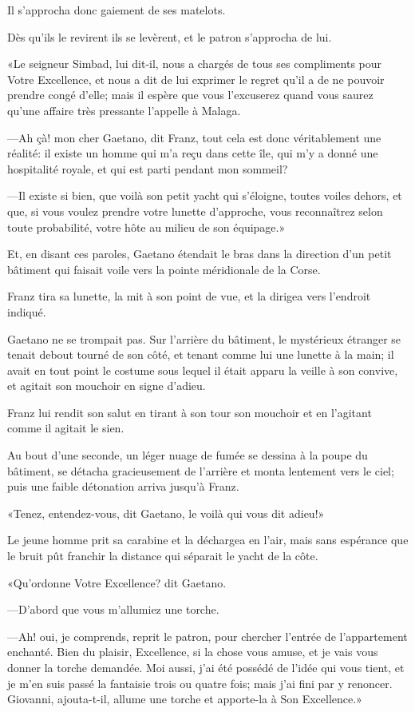 Il s'approcha donc gaiement de ses matelots. 

Dès qu'ils le revirent ils se levèrent, et le patron s'approcha de lui. 

«Le seigneur Simbad, lui dit-il, nous a chargés de tous ses compliments pour Votre Excellence, et nous a dit de lui exprimer le regret qu'il a de ne pouvoir prendre congé d'elle; mais il espère que vous l'excuserez quand vous saurez qu'une affaire très pressante l'appelle à Malaga. 

—Ah çà! mon cher Gaetano, dit Franz, tout cela est donc véritablement une réalité: il existe un homme qui m'a reçu dans cette île, qui m'y a donné une hospitalité royale, et qui est parti pendant mon sommeil? 

—Il existe si bien, que voilà son petit yacht qui s'éloigne, toutes voiles dehors, et que, si vous voulez prendre votre lunette d'approche, vous reconnaîtrez selon toute probabilité, votre hôte au milieu de son équipage.» 

Et, en disant ces paroles, Gaetano étendait le bras dans la direction d'un petit bâtiment qui faisait voile vers la pointe méridionale de la Corse. 

Franz tira sa lunette, la mit à son point de vue, et la dirigea vers l'endroit indiqué. 

Gaetano ne se trompait pas. Sur l'arrière du bâtiment, le mystérieux étranger se tenait debout tourné de son côté, et tenant comme lui une lunette à la main; il avait en tout point le costume sous lequel il était apparu la veille à son convive, et agitait son mouchoir en signe d'adieu. 

Franz lui rendit son salut en tirant à son tour son mouchoir et en l'agitant comme il agitait le sien. 

Au bout d'une seconde, un léger nuage de fumée se dessina à la poupe du bâtiment, se détacha gracieusement de l'arrière et monta lentement vers le ciel; puis une faible détonation arriva jusqu'à Franz. 

«Tenez, entendez-vous, dit Gaetano, le voilà qui vous dit adieu!» 

Le jeune homme prit sa carabine et la déchargea en l'air, mais sans espérance que le bruit pût franchir la distance qui séparait le yacht de la côte. 

«Qu'ordonne Votre Excellence? dit Gaetano. 

—D'abord que vous m'allumiez une torche. 

—Ah! oui, je comprends, reprit le patron, pour chercher l'entrée de l'appartement enchanté. Bien du plaisir, Excellence, si la chose vous amuse, et je vais vous donner la torche demandée. Moi aussi, j'ai été possédé de l'idée qui vous tient, et je m'en suis passé la fantaisie trois ou quatre fois; mais j'ai fini par y renoncer. Giovanni, ajouta-t-il, allume une torche et apporte-la à Son Excellence.» 

